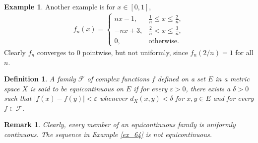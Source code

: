 \documentclass[11pt]{book}
\newtheorem{definition}{Definition}[chapter]
\newtheorem{remark}{Remark}[chapter]
\theoremstyle{definition}
\newtheorem{example}{Example}[chapter]
\numberwithin{equation}{chapter}
\begin{document}
\medskip

\begin{example}
Another example is for $x \in [0,1]$,
\begin{align*}
    f_n(x) = \begin{cases}
        nx - 1, & \frac{1}{n} \leq x \leq \frac{2}{n}, \\
        -nx + 3, & \frac{2}{n} < x \leq \frac{3}{n}, \\
        0, & \text{otherwise}.
    \end{cases}
\end{align*}
Clearly $f_n$ converges to $0$ pointwise, but not uniformly, since $f_n(2/n) = 1$ for all $n$.
\end{example}

\medskip

\begin{definition}
A family $\mathscr{F}$ of complex functions $f$ defined on a set $E$ in a metric space $X$ is said to be equicontinuous on $E$ if for every $\varepsilon > 0$, there exists a $\delta > 0$ such that $\left|f(x) - f(y)\right| < \varepsilon$ whenever $d_X(x,y) < \delta$ for $x,y \in E$ and for every $f \in \mathscr{F}$.
\end{definition}

\begin{remark}
Clearly, every member of an equicontinuous family is uniformly continuous. The sequence in Example \ref{ex_64} is not equicontinuous.
\end{remark}

\medskip
\end{document}
